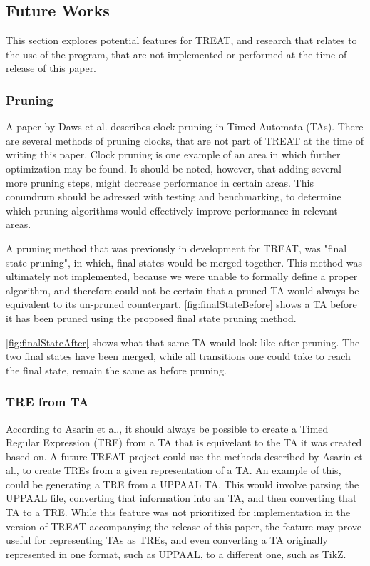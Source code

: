 \subsection{Future Works}\label{subsec:futureWorks}
This section explores potential features for TREAT, and research that relates to the use of the program, that are not implemented or performed at the time of release of this paper.

\subsubsection{Pruning}\label{futureWorks:pruning}
A paper by Daws et al. \cite{Daws1996} describes clock pruning in Timed Automata (TAs). There are several methods of pruning clocks, that are not part of TREAT at the time of writing this paper.
Clock pruning is one example of an area in which further optimization may be found. It should be noted, however, that adding several more pruning steps, might decrease performance in certain areas.
This conundrum should be adressed with testing and benchmarking, to determine which pruning algorithms would effectively improve performance in relevant areas.

A pruning method that was previously in development for TREAT, was "final state pruning", in which, final states would be merged together. This method was ultimately not implemented, because we were unable to formally define a proper algorithm, and therefore could not be certain that a pruned TA would always be equivalent to its un-pruned counterpart.
\cref{fig:finalStateBefore} shows a TA before it has been pruned using the proposed final state pruning method.



\cref{fig:finalStateAfter} shows what that same TA would look like after pruning. The two final states have been merged, while all transitions one could take to reach the final state, remain the same as before pruning.




\subsubsection{TRE from TA}
According to Asarin et al.\cite{Eugene2001}, it should always be possible to create a Timed Regular Expression (TRE) from a TA that is equivelant to the TA it was created based on.
A future TREAT project could use the methods described by Asarin et al., to create TREs from a given representation of a TA. An example of this, could be generating a TRE from a UPPAAL TA.
This would involve parsing the UPPAAL file, converting that information into an TA, and then converting that TA to a TRE.
While this feature was not prioritized for implementation in the version of TREAT accompanying the release of this paper, the feature may prove useful for representing TAs as TREs, and even converting a TA originally represented in one format, such as UPPAAL, to a different one, such as TikZ.

